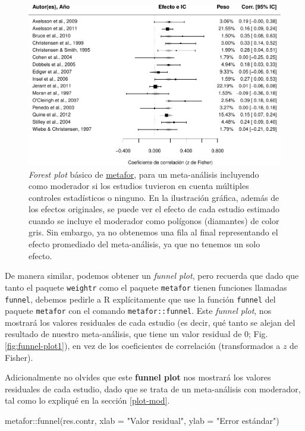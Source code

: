 \documentclass[
  bookmarksnumbered]{article}
\newenvironment{Shaded}{\begin{snugshade}}{\end{snugshade}}
\newcommand{\AttributeTok}[1]{\textcolor[rgb]{0.00,0.34,0.68}{#1}}
\newcommand{\FunctionTok}[1]{\textcolor[rgb]{0.39,0.29,0.61}{#1}}
\newcommand{\NormalTok}[1]{\textcolor[rgb]{0.12,0.11,0.11}{#1}}
\newcommand{\SpecialCharTok}[1]{\textcolor[rgb]{0.24,0.68,0.91}{#1}}
\newcommand{\StringTok}[1]{\textcolor[rgb]{0.75,0.01,0.01}{#1}}
\begin{document}
\begin{figure}
\centering
\includegraphics{Meta-analysis_files/figure-latex/for-plot-mod2-1.pdf}
\caption{\label{fig:for-plot-mod2}\emph{Forest plot} básico de \href{https://www.metafor-project.org/doku.php}{metafor}, para un meta-análisis incluyendo como moderador si los estudios tuvieron en cuenta múltiples controles estadísticos o ninguno. En la ilustración gráfica, además de los efectos originales, se puede ver el efecto de cada estudio estimado cuando se incluye el moderador como polígonos (diamantes) de color gris. Sin embargo, ya no obtenemos una fila al final representando el efecto promediado del meta-análisis, ya que no tenemos un solo efecto.}
\end{figure}

De manera similar, podemos obtener un \emph{funnel plot}, pero recuerda que dado que tanto el paquete \texttt{weightr} como el paquete \texttt{metafor} tienen funciones llamadas \texttt{funnel}, debemos pedirle a R explícitamente que use la función \texttt{funnel} del paquete \texttt{metafor} con el comando \texttt{metafor::funnel}.
Este \emph{funnel plot}, nos mostrará los valores residuales de cada estudio (es decir, qué tanto se alejan del resultado de nuestro meta-análisis, que tiene un valor residual de 0; Fig. \ref{fig:funnel-plot1}), en vez de los coeficientes de correlación (transformados a \(z\) de Fisher).

Adicionalmente no olvides que este \textbf{funnel plot} nos mostrará los valores residuales de cada estudio, dado que se trata de un meta-análisis con moderador, tal como lo expliqué en la sección \ref{plot-mod}.

\begin{Shaded}
\begin{Highlighting}[]
\NormalTok{metafor}\SpecialCharTok{::}\FunctionTok{funnel}\NormalTok{(res.contr,}
                \AttributeTok{xlab =} \StringTok{"Valor residual"}\NormalTok{,}
                \AttributeTok{ylab =} \StringTok{"Error estándar"}\NormalTok{)}
\end{Highlighting}
\end{Shaded}
\end{document}
